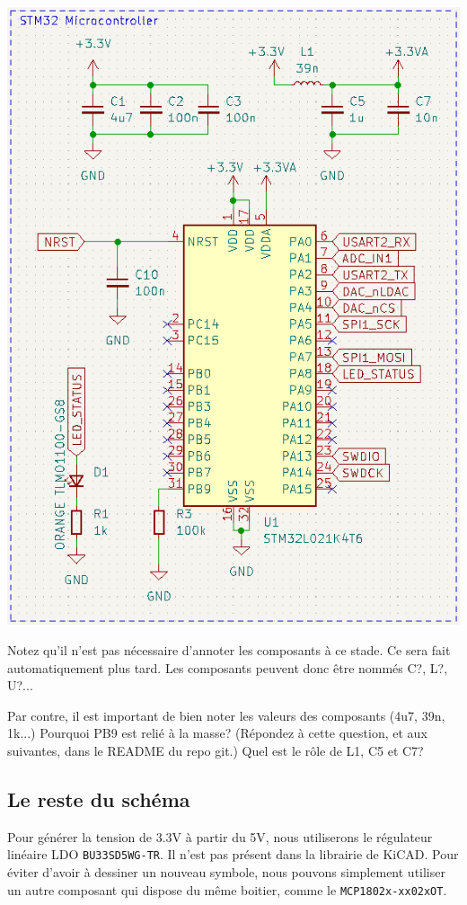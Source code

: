 \documentclass[12pt,%
addpoints,%
]{exam}
\begin{document}
\begin{questions}
    \begin{center}
        \includegraphics[scale=0.5]{figures/kicad07.png}
    \end{center}

		Notez qu'il n'est pas nécessaire d'annoter les composants à ce stade. Ce sera fait automatiquement plus tard.
		Les composants peuvent donc être nommés C?, L?, U?...

		Par contre, il est important de bien noter les valeurs des composants (4u7, 39n, 1k...)
	\question Pourquoi PB9 est relié à la masse? (Répondez à cette question, et aux suivantes, dans le README du repo git.)
	\question Quel est le rôle de L1, C5 et C7?
\end{questions}

\newpage

\subsection{Le reste du schéma}
Pour générer la tension de 3.3V à partir du 5V, nous utiliserons le régulateur linéaire LDO \texttt{BU33SD5WG-TR}.
Il n'est pas présent dans la librairie de KiCAD. 
Pour éviter d'avoir à dessiner un nouveau symbole, nous pouvons simplement utiliser un autre composant qui dispose du même boitier, comme le \texttt{MCP1802x-xx02xOT}.
\end{document}
